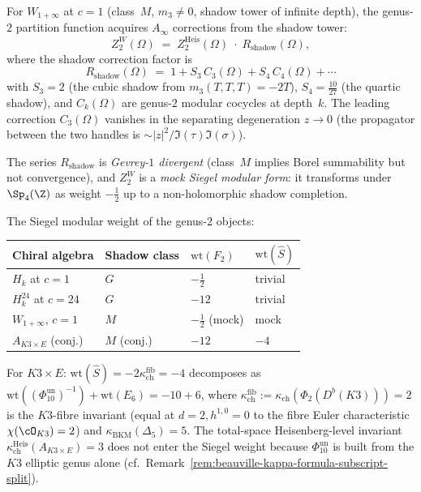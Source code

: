 \begin{conjecture}
\label{conj:genus2-w1inf}
\ClaimStatusConjectured
For $W_{1+\infty}$ at $c = 1$ \textup{(}class~$M$, $m_3 \neq 0$,
shadow tower of infinite depth\textup{)}, the genus-$2$ partition
function acquires $A_\infty$ corrections from the shadow tower:
\[
 Z_2^{W}(\Omega)
 \;=\;
 Z_2^{\mathrm{Heis}}(\Omega)
 \;\cdot\;
 R_{\mathrm{shadow}}(\Omega),
\]
where the shadow correction factor is
\[
 R_{\mathrm{shadow}}(\Omega)
 \;=\;
 1 + S_3\, C_3(\Omega) + S_4\, C_4(\Omega) + \cdots
\]
with $S_3 = 2$ \textup{(}the cubic shadow from $m_3(T,T,T) = -2T$\textup{)},
$S_4 = \tfrac{10}{27}$ \textup{(}the quartic shadow\textup{)}, and $C_k(\Omega)$
are genus-$2$ modular cocycles at depth~$k$. The leading correction
$C_3(\Omega)$ vanishes in the separating degeneration $z \to 0$
\textup{(}the propagator between the two handles is $\sim |z|^2 / \Im(\tau)\Im(\sigma)$\textup{)}.

The series $R_{\mathrm{shadow}}$ is \emph{Gevrey-$1$ divergent} (class~$M$
implies Borel summability but not convergence), and $Z_2^W$ is a
\emph{mock Siegel modular form}: it transforms under $\Sp_4(\Z)$ as
weight $-\frac{1}{2}$ up to a non-holomorphic shadow completion.
\end{conjecture}

\begin{remark}
\label{rem:sp4-weight-table}
The Siegel modular weight of the genus-$2$ objects:
\begin{center}
\renewcommand{\arraystretch}{1.2}
\begin{tabular}{llll}
 \toprule
 Chiral algebra & Shadow class & $\mathrm{wt}(F_2)$ & $\mathrm{wt}(\hat{S})$ \\
 \midrule
 $H_k$ at $c=1$ & $G$ & $-\frac{1}{2}$ & trivial \\
 $H_k^{24}$ at $c=24$ & $G$ & $-12$ & trivial \\
 $W_{1+\infty}$, $c=1$ & $M$ & $-\frac{1}{2}$ (mock) & mock \\
 $A_{K3 \times E}$ (conj.) & $M$ (conj.) & $-12$ & $-4$ \\
 \bottomrule
\end{tabular}
\end{center}
For $K3 \times E$: $\mathrm{wt}(\hat{S}) = -2\kappa_{\mathrm{ch}}^{\mathrm{fib}} = -4$
decomposes as $\mathrm{wt}((\Phi_{10}^{\mathrm{un}})^{-1}) + \mathrm{wt}(E_6) = -10 + 6$,
where $\kappa_{\mathrm{ch}}^{\mathrm{fib}} := \kappa_{\mathrm{ch}}(\Phi_2(D^b(K3))) = 2$
is the $K3$-fibre invariant (equal at $d = 2, h^{1,0}=0$ to the fibre
Euler characteristic $\chi(\cO_{K3}) = 2$) and $\kappa_{\mathrm{BKM}}(\Delta_5) = 5$.
The total-space Heisenberg-level invariant $\kappa_{\mathrm{ch}}^{\mathrm{Heis}}(A_{K3 \times E}) = 3$
does not enter the Siegel weight because $\Phi_{10}^{\mathrm{un}}$ is built from
the $K3$ elliptic genus alone (cf.\ Remark~\ref{rem:beauville-kappa-formula-subscript-split}).
\end{remark}

